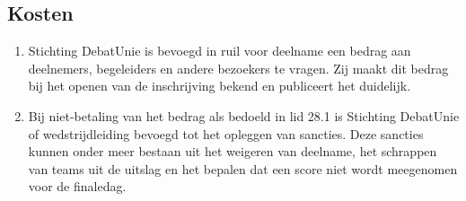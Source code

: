 \subsection{Kosten}

\begin{enumerate}
\item Stichting DebatUnie is bevoegd in ruil voor deelname een bedrag aan deelnemers, begeleiders en andere bezoekers te vragen. Zij maakt dit bedrag bij het openen van de inschrijving bekend en publiceert het duidelijk.
\item Bij niet-betaling van het bedrag als bedoeld in lid 28.1 is Stichting DebatUnie of wedstrijdleiding bevoegd tot het opleggen van sancties. Deze sancties kunnen onder meer bestaan uit het weigeren van deelname, het schrappen van teams uit de uitslag en het bepalen dat een score niet wordt meegenomen voor de finaledag.
\end{enumerate}
